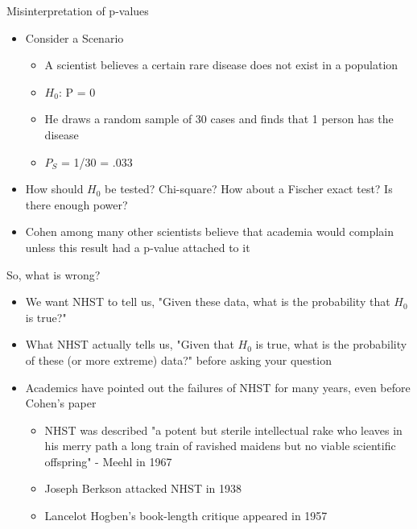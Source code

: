 \documentclass[aspectratio=169, 12pt]{beamer}
\begin{document}
\begin{frame}{Misinterpretation of p-values}
\begin{itemize} %
\item Consider a Scenario
   \begin{itemize}
   \item A scientist believes a certain rare disease does not exist in a population
   \item $H_0$: P = 0
   \item He draws a random sample of 30 cases and finds that 1 person has the disease
   \item $P_S$ = 1/30 = .033
   \end{itemize}
\item How should $H_0$ be tested? Chi-square? How about a Fischer exact test? Is there enough power?
\item Cohen among many other scientists believe that academia would complain unless this result had a p-value attached to it
 \end{itemize}
\end{frame}

\begin{frame}{So, what is wrong?}
  \begin{itemize}
  \item We want NHST to tell us, "Given these data, what is the probability that $H_0$ is true?"
  \item What NHST actually tells us, "Given that $H_0$ is true, what is the probability of these (or more extreme) data?"
    before asking your question
  \item Academics have pointed out the failures of NHST for many years, even before Cohen's paper
    \begin{itemize}
    \item NHST was described "a potent but sterile intellectual rake who leaves in his merry path a long train of ravished maidens but no viable scientific offspring" - Meehl in 1967
    \item Joseph Berkson attacked NHST in 1938
    \item Lancelot Hogben's book-length critique appeared in 1957
    \end{itemize}
  \end{itemize}
\end{frame}
\end{document}
